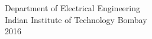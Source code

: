 \begin{titlepage}
\begin{center}
	
	\vspace{-0.2in}
	\large{%
	Department of Electrical Engineering\\
 	\vspace{0.05in}
	Indian Institute of Technology Bombay\\
	2016
	}

	\end{center}
\end{titlepage}
